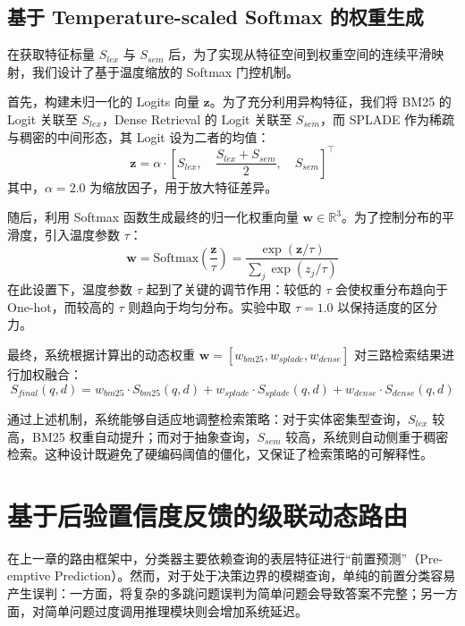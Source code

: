 \subsection{基于 Temperature-scaled Softmax 的权重生成}\label{subsec:weight_modulation}

在获取特征标量 $S_{lex}$ 与 $S_{sem}$ 后，为了实现从特征空间到权重空间的连续平滑映射，我们设计了基于温度缩放的 Softmax 门控机制。

首先，构建未归一化的 Logits 向量 $\mathbf{z}$。为了充分利用异构特征，我们将 BM25 的 Logit 关联至 $S_{lex}$，Dense Retrieval 的 Logit 关联至 $S_{sem}$，而 SPLADE 作为稀疏与稠密的中间形态，其 Logit 设为二者的均值：
\begin{equation}
\mathbf{z} = \alpha \cdot \left[ S_{lex}, \quad \frac{S_{lex} + S_{sem}}{2}, \quad S_{sem} \right]^\top
\end{equation}
其中，$\alpha=2.0$ 为缩放因子，用于放大特征差异。

随后，利用 Softmax 函数生成最终的归一化权重向量 $\mathbf{w} \in \mathbb{R}^3$。为了控制分布的平滑度，引入温度参数 $\tau$：
\begin{equation}
\mathbf{w} = \text{Softmax}\left( \frac{\mathbf{z}}{\tau} \right) = \frac{\exp(\mathbf{z} / \tau)}{\sum_{j} \exp(z_j / \tau)}
\end{equation}
在此设置下，温度参数 $\tau$ 起到了关键的调节作用：较低的 $\tau$ 会使权重分布趋向于 One-hot，而较高的 $\tau$ 则趋向于均匀分布。实验中取 $\tau=1.0$ 以保持适度的区分力。

最终，系统根据计算出的动态权重 $\mathbf{w} = [w_{bm25}, w_{splade}, w_{dense}]$ 对三路检索结果进行加权融合：
\begin{equation}
S_{final}(q, d) = w_{bm25} \cdot S_{bm25}(q,d) + w_{splade} \cdot S_{splade}(q,d) + w_{dense} \cdot S_{dense}(q,d)
\end{equation}

通过上述机制，系统能够自适应地调整检索策略：对于实体密集型查询，$S_{lex}$ 较高，BM25 权重自动提升；而对于抽象查询，$S_{sem}$ 较高，系统则自动侧重于稠密检索。这种设计既避免了硬编码阈值的僵化，又保证了检索策略的可解释性。

\section{基于后验置信度反馈的级联动态路由}\label{sec:cascading_routing}

在上一章的路由框架中，分类器主要依赖查询的表层特征进行“前置预测”（Pre-emptive Prediction）。然而，对于处于决策边界的模糊查询，单纯的前置分类容易产生误判：一方面，将复杂的多跳问题误判为简单问题会导致答案不完整；另一方面，对简单问题过度调用推理模块则会增加系统延迟。

